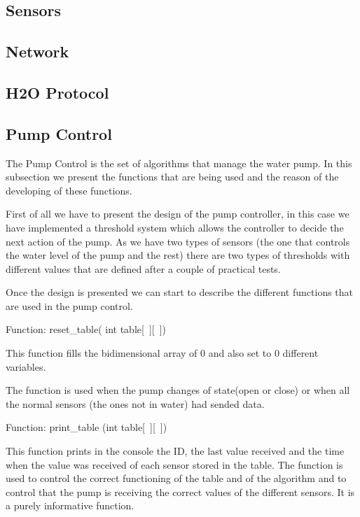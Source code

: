\documentclass[11pt,paper=a4,parskip=half]{scrartcl}
\begin{document}
\subsection{Sensors}



\subsection{Network}



\subsection{H2O Protocol}



\subsection{Pump Control}

The Pump Control is the set of algorithms that manage the water pump.
In this subsection we present the functions that are being used and the reason of the developing of these functions.

First of all we have to present the design of the pump controller, in this case we have implemented a threshold system which allows the controller to decide the next action of the pump. As we have two types of sensors (the one that controls the water level of the pump and the rest) there are two types of thresholds with different values that are defined after a couple of practical tests.

Once the design is presented we can start to describe the different functions that are used in the pump control.

Function: reset\_table( int table[~][~])

This function  fills the bidimensional array of 0 and also set to 0 different variables.

The function is used when the pump changes of state(open or close) or when all the normal sensors (the ones not in water) had sended data.

Function: print\_table (int table[~][~])

This function prints in the console the ID, the last value received and the time when the value was received of each sensor stored in the table.
The function is used to control the correct functioning of the table and of the algorithm and to control that the pump is receiving the correct values of the different sensors.
It is a purely informative function.
\end{document}
